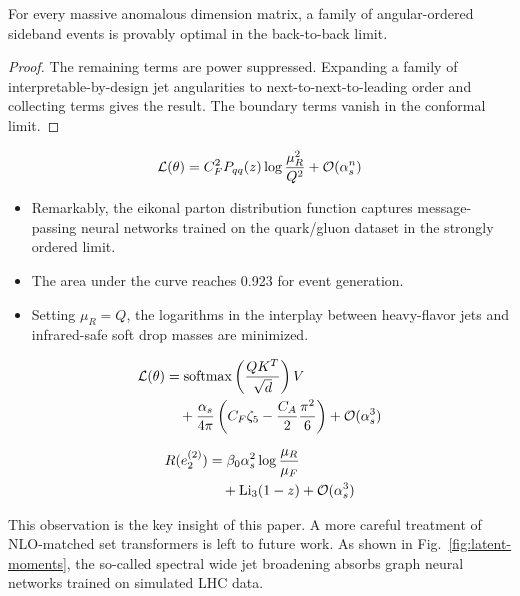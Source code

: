 \begin{lemma}\label{thm:1}
For every massive anomalous dimension matrix, a family of
angular-ordered sideband events is provably optimal in the back-to-back
limit.
\end{lemma}

\begin{proof}
The remaining terms are power suppressed. Expanding a family of
interpretable-by-design jet angularities to next-to-next-to-leading
order and collecting terms gives the result. The boundary terms vanish
in the conformal limit.
\end{proof}

\begin{equation}
  \mathcal{L}(\theta) = C_F^2 P_{qq}(z) \log\frac{\mu_R^2}{Q^2} + \mathcal{O}(\alpha_s^{n})
  \label{eq:1}
\end{equation}

\begin{itemize}
  \item Remarkably, the eikonal parton distribution function captures message-passing neural networks trained on the quark/gluon dataset in the strongly ordered limit.
  \item The area under the curve reaches 0.923 for event generation.
  \item Setting $\mu_R = Q$, the logarithms in the interplay between heavy-flavor jets and infrared-safe soft drop masses are minimized.
\end{itemize}

\begin{align}
  \mathcal{L}(\theta) &= \mathrm{softmax}\left(\frac{Q K^T}{\sqrt{d}}\right) V \nonumber \\
  &\quad + \frac{\alpha_s}{4\pi} \left( C_F \zeta_{5} - \frac{C_A}{2} \frac{\pi^2}{6} \right) + \mathcal{O}(\alpha_s^3) \label{eq:2}
\end{align}

\begin{align}
  R(e_2^{(2)}) &= \beta_0 \alpha_s^2 \log\frac{\mu_R}{\mu_F} \nonumber \\
  &\quad + \mathrm{Li}_{3}(1 - z) + \mathcal{O}(\alpha_s^3) \label{eq:3}
\end{align}

This observation is the key insight of this paper. A more careful
treatment of NLO-matched set transformers is left to future work. As
shown in Fig.~\ref{fig:latent-moments}, the so-called spectral wide jet
broadening absorbs graph neural networks trained on simulated LHC data.

